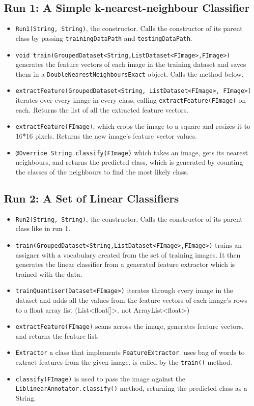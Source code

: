 \documentclass[a4paper,12pt]{article}
\begin{document}
\subsection{Run 1: A Simple k-nearest-neighbour Classifier}
\begin{itemize}
	\item \texttt{Run1(String, String)}, the constructor. Calls the constructor of its parent class by passing \texttt{trainingDataPath} and \texttt{testingDataPath}.
	\item \texttt{void train(GroupedDataset<String,ListDataset<FImage>,FImage>)} generates the feature vectors of each image in the training dataset and saves them in a \texttt{DoubleNearestNeighboursExact} object. Calls the method below.
	\item \texttt{extractFeature(GroupedDataset<String, ListDataset<FImage>, FImage>)} iterates over every image in every class, calling \texttt{extractFeature(FImage)} on each. Returns the list of all the extracted feature vectors.
	\item \texttt{extractFeature(FImage)}, which crops the image to a square and resizes it to 16*16 pixels. Returns the new image's feature vector values.
	\item \texttt{@Override String classify(FImage)} which takes an image, gets its nearest neighbours, and returns the predicted class, which is generated by counting the classes of the neighbours to find the most likely class.
\end{itemize}

\subsection{Run 2: A Set of Linear Classifiers}
\begin{itemize}
	\item \texttt{Run2(String, String)}, the constructor. Calls the constructor of its parent class like in run 1.
	\item \texttt{train(GroupedDataset<String,ListDataset<FImage>,FImage>)} trains an assigner with a vocabulary created from the set of training images. It then generates the linear classifier from a generated feature extractor which is trained with the data.
	\item \texttt{trainQuantiser(Dataset<FImage>)} iterates through every image in the dataset and adds all the values from the feature vectors of each image's rows to a float array list (List<float[]>, not ArrayList<float>)
	\item \texttt{extractFeature(FImage)} scans across the image, generates feature vectors, and returns the feature list.
	\item \texttt{Extractor} a class that implements \texttt{FeatureExtractor}. uses bag of words to extract features from the given image. is called by the \texttt{train()} method.
	\item \texttt{classify(FImage)} is used to pass the image against the \texttt{LiblinearAnnotator.classify()} method, returning the predicted class as a String.
\end{itemize}
\end{document}
